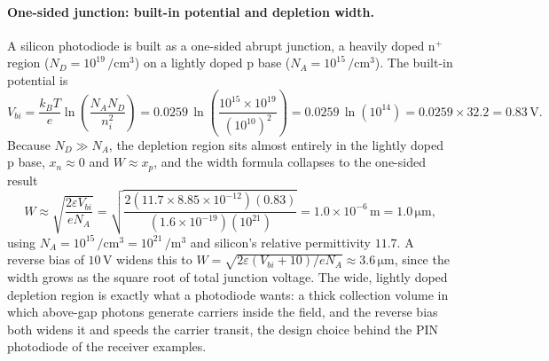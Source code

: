 \paragraph{One-sided junction: built-in potential and depletion width.}
A silicon photodiode is built as a one-sided abrupt junction, a heavily
doped n$^{+}$ region ($N_D = 10^{19}\,\si{\per\centi\meter\cubed}$) on a
lightly doped p base ($N_A = 10^{15}\,\si{\per\centi\meter\cubed}$). The
built-in potential is
\[
V_{bi} = \frac{k_B T}{e}\ln\!\left(\frac{N_A N_D}{n_i^{2}}\right)
= 0.0259\,\ln\!\left(\frac{10^{15}\times 10^{19}}{(10^{10})^{2}}\right)
= 0.0259\,\ln(10^{14}) = 0.0259\times 32.2 = 0.83\,\si{\volt}.
\]
Because $N_D \gg N_A$, the depletion region sits almost entirely in the
lightly doped p base, $x_n \approx 0$ and $W \approx x_p$, and the width
formula collapses to the one-sided result
\[
W \approx \sqrt{\frac{2\varepsilon V_{bi}}{eN_A}}
= \sqrt{\frac{2(11.7\times 8.85\times 10^{-12})(0.83)}
             {(1.6\times 10^{-19})(10^{21})}}
= 1.0\times 10^{-6}\,\si{\meter} = 1.0\,\si{\micro\meter},
\]
using $N_A = 10^{15}\,\si{\per\centi\meter\cubed} = 10^{21}\,\si{\per
\meter\cubed}$ and silicon's relative permittivity $11.7$. A reverse bias
of $10\,\si{\volt}$ widens this to $W = \sqrt{2\varepsilon(V_{bi}+10)/
eN_A} \approx 3.6\,\si{\micro\meter}$, since the width grows as the square
root of total junction voltage. The wide, lightly doped depletion region
is exactly what a photodiode wants: a thick collection volume in which
above-gap photons generate carriers inside the field, and the reverse bias
both widens it and speeds the carrier transit, the design choice behind
the PIN photodiode of the receiver examples.

